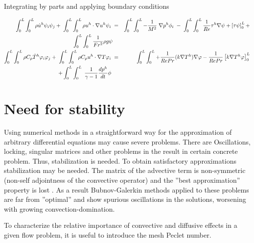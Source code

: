 Integrating by parts and applying boundary conditions

\begin{eqnarray*}
\int_{0}^{L} \int_{0}^{L}\rho \dot{u}^h \psi_i \psi_j + \hspace{1mm}\int_{0}^{L} \int_{0}^{L} \rho u^h \cdot \nabla u^h \psi_i \hspace{1mm} &=& \int_{0}^{L} \int_{0}^{L}  -\frac{1}{M^2}\hspace{1mm}\nabla p^h \phi_i \hspace{1mm} - \hspace{1mm}\int_{0}^{L} \int_{0}^{L}\frac{1}{Re} \tau^h \nabla \psi + \left[\tau \psi \right]_0^L+ \\ \int_{0}^{L} \int_{0}^{L}\frac{1}{Fr^2}\rho g \psi \\
\int_{0}^{L} \int_{0}^{L} \rho C_p \dot{T}^h \varphi_i \varphi_j + \hspace{1mm}\int_{0}^{L} \int_{0}^{L} \rho C_p u^h \cdot \nabla T \varphi_i \hspace{1mm}&=&\hspace{1mm} \int_{0}^{L} \int_{0}^{L} +  \frac{1}{Re Pr}(k \nabla T^h) \nabla \varphi  -  \frac{1}{Re Pr} \left[k \nabla T^h \varphi \right]_0^L \\ + \int_{0}^{L} \int_{0}^{L} \hspace{1mm} \frac{1}{\gamma -1} \frac{d p^h}{d t} \phi\hspace{1mm} \\
\end{eqnarray*}

\section{Need for stability}
Using numerical methods in a straightforward way for the approximation of arbitrary differential
equations may cause severe problems. There are Oscillations, locking, singular matrices and other problems in the result in certain concrete problem.
Thus, stabilization is needed. To obtain satisfactory approximations stabilization may be needed. The matrix of the advective term is non-symmetric (non-self adjointness of the convective operator) and the ”best approximation” property is lost . As a result Bubnov-Galerkin methods applied to these problems are far from ”optimal” and show spurious oscillations in the solutions, worsening with growing convection-domination. 

\noindent To characterize the relative importance of convective and diffusive effects in a given flow
problem, it is useful to introduce the mesh Peclet number.

